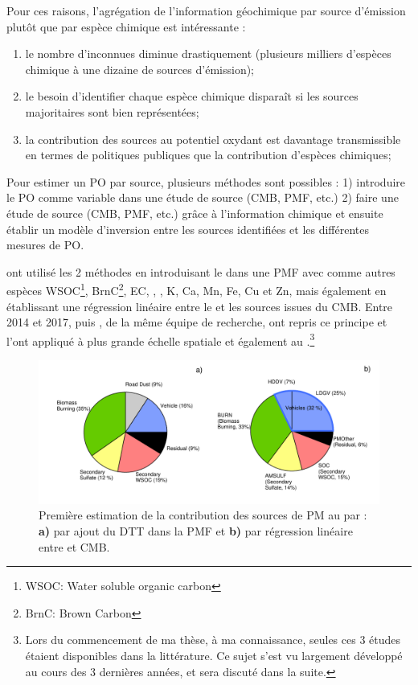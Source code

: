 Pour ces raisons, l'agrégation de l'information géochimique par source d'émission plutôt
que par espèce chimique est intéressante :
\begin{enumerate}
    \item le nombre d'inconnues diminue drastiquement (plusieurs milliers d'espèces
        chimique à une dizaine de sources d'émission);
    \item le besoin d'identifier chaque espèce chimique disparaît si les sources
        majoritaires sont bien représentées;
    \item la contribution des sources au potentiel oxydant est davantage transmissible
        en termes de politiques publiques que la contribution d'espèces chimiques;
\end{enumerate}

Pour estimer un PO par source, plusieurs méthodes sont possibles : 1) introduire le PO
comme variable dans une étude de source (CMB, PMF, etc.) 2) faire une étude de source
(CMB, PMF, etc.) grâce à l'information chimique et ensuite établir un modèle d'inversion
entre les sources identifiées et les différentes mesures de PO.

\cite{vermaReactive2014} ont utilisé les 2 méthodes en introduisant le
\PODTT{} dans une PMF avec comme autres espèces WSOC\footnote{WSOC: Water soluble
organic carbon}, BrnC\footnote{BrnC: Brown Carbon}, EC, \SOq, \NHt, K, Ca, Mn, Fe, Cu et
Zn, mais également en établissant une régression linéaire entre le \PODTT{} et les sources
issues du CMB.
Entre 2014 et 2017, \cite{batesReactive2015} puis \cite{fangOxidative2016}, de la même
équipe de recherche, ont repris ce principe et l'ont appliqué à plus grande échelle
spatiale et également au \POAAv.\footnote{Lors du commencement de ma thèse, à ma connaissance, seules ces 3 études étaient
disponibles dans la littérature. Ce sujet s'est vu largement développé au cours des 3
dernières années, et sera discuté dans la suite.}

\begin{figure}[ht]
    \centering
    \includegraphics[width=1.0\linewidth]{figures/chapter04/verma_2014_fig8.pdf}
    \caption{Première estimation de la contribution des sources de PM au \PODTT{} par
        \cite[][figure 8]{vermaReactive2014}: \textbf{a)} par ajout du DTT dans la PMF et
        \textbf{b)} par régression linéaire entre \PODTT{} et CMB.
    }%
    \label{fig:figures/chapter04/verma_2014_fig8}
\end{figure}

